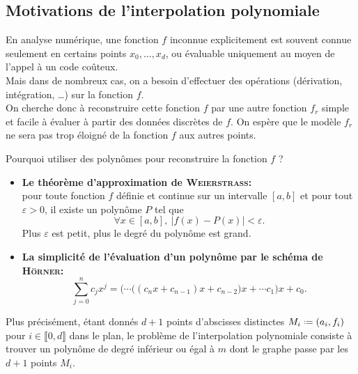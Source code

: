 \subsection{Motivations de l'interpolation polynomiale}
En analyse numérique, une fonction $f$ inconnue explicitement est souvent connue seulement en certains points $x_0, \dots, x_d$, ou évaluable uniquement au moyen de l'appel à un code coûteux. \\
Mais dans de nombreux cas, on a besoin d'effectuer des opérations (dérivation, intégration, \dots) sur la fonction $f$. \\
On cherche donc à reconstruire cette fonction $f$ par une autre fonction $f_r$ simple et facile à évaluer à partir des données discrètes de $f$. On espère que le modèle $f_r$ ne sera pas trop éloigné de la fonction $f$ aux autres points.
\begin{center}
    Pourquoi utiliser des polynômes pour reconstruire la fonction $f$ ?    
\end{center}
\begin{itemize}
    \item \textbf{Le théorème d'approximation de \textsc{Weierstrass}:} \note \\
    pour toute fonction $f$ définie et continue sur un intervalle $[a, b]$ et pour tout $\varepsilon > 0$, il existe un polynôme $P$ tel que 
    $$\forall x \in [a, b],\ |f(x) - P(x)| < \varepsilon.$$
    Plus $\varepsilon$ est petit, plus le degré du polynôme est grand.
    \item \textbf{La simplicité de l'évaluation d'un polynôme par le schéma de \textsc{Hörner}:}
    $$\sum_{j=0}^n c_j x^j = \Big( \cdots \big( (c_n x + c_{n-1})x + c_{n-2} \big)x + \cdots c_1 \Big)x + c_0.$$
\end{itemize}

\begin{marginfigure}[-1cm]
    \centering
    
\end{marginfigure}

Plus précisément, étant donnés $d+1$ points d'abscisses distinctes $M_i \defeq (a_i, f_i)$ pour $i \in \llbracket 0, d \rrbracket$ dans le plan, le problème de l'interpolation polynomiale consiste à trouver un polynôme de degré inférieur ou égal à $m$ dont le graphe passe par les $d+1$ points $M_i$.\\

